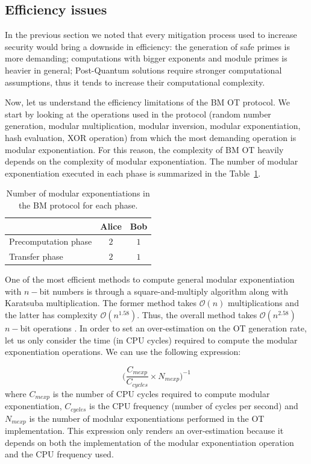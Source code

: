 \subsection{Efficiency issues}

In the previous section we noted that every mitigation process used to increase security would bring a downside in efficiency: the generation of safe primes is more demanding; computations with bigger exponents and module primes is heavier in general; Post-Quantum solutions require stronger computational assumptions, thus it tends to increase their computational complexity. 

Now, let us understand the efficiency limitations of the BM OT protocol. We start by looking at the operations used in the protocol (random number generation, modular multiplication, modular inversion, modular exponentiation, hash evaluation, XOR operation) from which the most demanding operation is modular exponentiation. For this reason, the complexity of BM OT heavily depends on the complexity of modular exponentiation. The number of modular exponentiation executed in each phase is summarized in the Table~\ref{table:BMOT_mexp}.


\begin{table}[h!]
\centering
\begin{tabular}{lcc}
\toprule
 & Alice & Bob \\
\midrule
\multicolumn{1}{l}{Precomputation phase}   & $2$  & $1$  \\
\multicolumn{1}{l}{Transfer phase} & $2$  & $1$\\
\bottomrule
\end{tabular}
\caption{Number of modular exponentiations in the BM protocol for each phase.}
\label{table:BMOT_mexp}
\end{table}

One of the most efficient methods to compute general modular exponentiation with $n-$bit numbers is through a square-and-multiply algorithm along with Karatsuba multiplication. The former method takes $\mathcal{O}(n)$ multiplications and the latter has complexity $\mathcal{O}(n^{1.58})$. Thus, the overall method takes $\mathcal{O}(n^{2.58})$ $n-$bit operations \cite{MVV01}. In order to set an over-estimation on the OT generation rate, let us only consider the time (in CPU cycles) required to compute the modular exponentiation operations. We can use the following expression:

\begin{equation}
\label{eq:nOTs}
\Big( \frac{C_{mexp}}{C_{cycles}} \times N_{mexp} \Big)^{-1}
\end{equation}
where $C_{mexp}$ is the number of CPU cycles required to compute modular exponentiation, $C_{cycles}$ is the CPU frequency (number of cycles per second) and $N_{mexp}$ is the number of modular exponentiations performed in the OT implementation. This expression only renders an over-estimation because it depends on both the implementation of the modular exponentiation operation and the CPU frequency used. 


